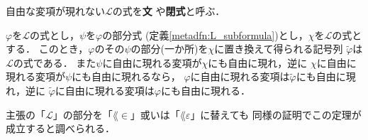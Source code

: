 	\begin{screen}
		\begin{metadfn}[文]
			自由な変項が現れない$\mathcal{L}$の式を{\bf 文}
			や{\bf 閉式}と呼ぶ．
		\end{metadfn}
	\end{screen}
	
	\begin{screen}
		\begin{metathm}[部分式を取り替えても式]
		\label{metathm:replace_subformula_with_some_formula}
			$\varphi$を$\mathcal{L}$の式とし，$\psi$を$\varphi$の部分式
			(定義\ref{metadfn:L_subformula})とし，$\chi$を$\mathcal{L}$の式とする．
			このとき，$\varphi$のその$\psi$の部分(一か所)を$\chi$に置き換えて得られる記号列
			$\widetilde{\varphi}$は$\mathcal{L}$の式である．
			また$\psi$に自由に現れる変項が$\chi$にも自由に現れ，逆に
			$\chi$に自由に現れる変項が$\psi$にも自由に現れるなら，
			$\varphi$に自由に現れる変項は$\widetilde{\varphi}$にも自由に現れ，逆に
			$\widetilde{\varphi}$に自由に現れる変項は$\varphi$にも自由に現れる．
		\end{metathm}
	\end{screen}
	
	主張の「$\mathcal{L}$」の部分を「$\lang{\in}$」或いは「$\lang{\varepsilon}$」に替えても
	同様の証明でこの定理が成立すると調べられる．
	
